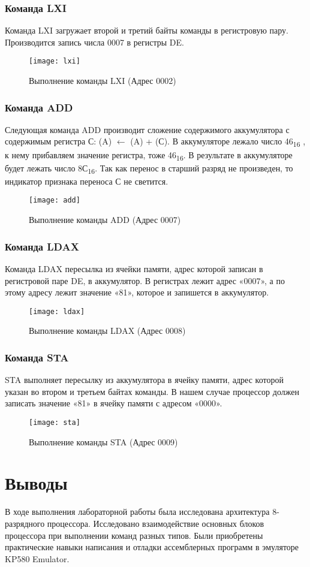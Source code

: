 \documentclass[a4paper,14pt]{extarticle}
\begin{document}
\subsubsection{Команда LXI}
Команда LXI загружает второй и третий байты команды в регистровую пару.
Производится запись числа 0007 в регистры DE.
\begin{figure}[H]
    \centering
    \texttt{[image: lxi]}
    \caption{Выполнение команды LXI (Адрес 0002)}
    \label{fig:lxi}
\end{figure}

\subsubsection{Команда ADD}
Следующая команда ADD производит сложение содержимого аккумулятора с
содержимым регистра С: (A) $\leftarrow$ (A) + (С). В аккумуляторе лежало число
46\textsubscript{16} , к нему прибавляем значение регистра, тоже 46\textsubscript{16}.
В результате в аккумуляторе будет лежать число 8С\textsubscript{16}.
Так как перенос в старший разряд не произведен, то индикатор
признака переноса С не светится.
\begin{figure}[H]
    \centering
    \texttt{[image: add]}
    \caption{Выполнение команды ADD (Адрес 0007)}
    \label{fig:add}
\end{figure}

\subsubsection{Команда LDAX}
Команда LDAX пересылка из ячейки памяти, адрес которой записан в регистровой
паре DE, в аккумулятор. В регистрах лежит адрес «0007», а по этому адресу лежит
значение «81», которое и запишется в аккумулятор.
\begin{figure}[H]
    \centering
    \texttt{[image: ldax]}
    \caption{Выполнение команды LDAX (Адрес 0008)}
    \label{fig:ldax}
\end{figure}

\subsubsection{Команда STA}
STA выполняет пересылку из аккумулятора в ячейку памяти, адрес которой указан
во втором и третьем байтах команды. В нашем случае процессор должен записать
значение «81» в ячейку памяти с адресом «0000».
\begin{figure}[H]
    \centering
    \texttt{[image: sta]}
    \caption{Выполнение команды STA (Адрес 0009)}
    \label{fig:sta}
\end{figure}

\section*{Выводы}
В ходе выполнения лабораторной работы была исследована архитектура 8-разрядного
процессора. Исследовано взаимодействие основных блоков процессора при выполнении
команд разных типов. Были приобретены практические навыки написания и отладки
ассемблерных программ в эмуляторе KP580 Emulator.
\end{document}
